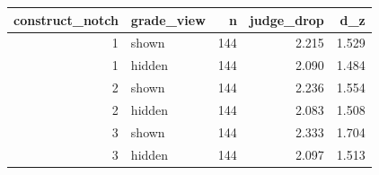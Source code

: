 \begin{tabular}{rlrrr}
\toprule
construct_notch & grade_view & n & judge_drop & d_z \\
\midrule
1 & shown & 144 & 2.215 & 1.529 \\
1 & hidden & 144 & 2.090 & 1.484 \\
2 & shown & 144 & 2.236 & 1.554 \\
2 & hidden & 144 & 2.083 & 1.508 \\
3 & shown & 144 & 2.333 & 1.704 \\
3 & hidden & 144 & 2.097 & 1.513 \\
\bottomrule
\end{tabular}
